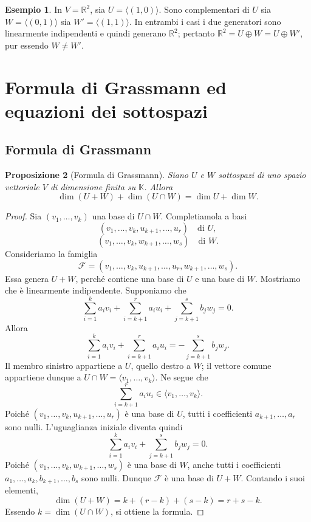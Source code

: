 \documentclass[11pt,a4paper]{article}
\newcommand{\RR}{\mathbb{R}}
\newcommand{\KK}{\mathbb{K}}
\theoremstyle{plain}
\newtheorem{prop}{Proposizione}[section]
\theoremstyle{definition}
\newtheorem{esempio}[prop]{Esempio}
\theoremstyle{remark}
\begin{document}
\begin{esempio}
In $V=\RR^2$, sia $U=\langle(1,0)\rangle$. Sono complementari di $U$ sia
$W=\langle(0,1)\rangle$ sia $W'=\langle(1,1)\rangle$. In entrambi i casi i
due generatori sono linearmente indipendenti e quindi generano $\RR^2$;
pertanto $\RR^2=U\oplus W=U\oplus W'$, pur essendo $W\ne W'$.
\end{esempio}

\section{Formula di Grassmann ed equazioni dei sottospazi}

\subsection{Formula di Grassmann}

\begin{prop}[Formula di Grassmann]\label{prop:grassmann}
Siano $U$ e $W$ sottospazi di uno spazio vettoriale $V$ di dimensione finita
su $\KK$. Allora
\[
 \dim(U+W)+\dim(U\cap W)=\dim U+\dim W.
\]
\end{prop}

\begin{proof}
Sia $(v_1,\ldots,v_k)$ una base di $U\cap W$. Completiamola a basi
\[
 (v_1,\ldots,v_k,u_{k+1},\ldots,u_r)\quad\text{di }U,
\]
\[
 (v_1,\ldots,v_k,w_{k+1},\ldots,w_s)\quad\text{di }W.
\]
Consideriamo la famiglia
\[
 \mathcal F=(v_1,\ldots,v_k,u_{k+1},\ldots,u_r,
 w_{k+1},\ldots,w_s).
\]
Essa genera $U+W$, perché contiene una base di $U$ e una base di $W$.
Mostriamo che è linearmente indipendente. Supponiamo che
\[
 \sum_{i=1}^k a_iv_i+\sum_{i=k+1}^r a_iu_i+
 \sum_{j=k+1}^s b_jw_j=0.
\]
Allora
\[
 \sum_{i=1}^k a_iv_i+\sum_{i=k+1}^r a_iu_i
 =-\sum_{j=k+1}^s b_jw_j.
\]
Il membro sinistro appartiene a $U$, quello destro a $W$; il vettore comune
appartiene dunque a $U\cap W=\langle v_1,\ldots,v_k\rangle$. Ne segue che
\[
 \sum_{i=k+1}^r a_iu_i\in\langle v_1,\ldots,v_k\rangle.
\]
Poiché $(v_1,\ldots,v_k,u_{k+1},\ldots,u_r)$ è una base di $U$, tutti i
coefficienti $a_{k+1},\ldots,a_r$ sono nulli. L'uguaglianza iniziale diventa
quindi
\[
 \sum_{i=1}^k a_iv_i+\sum_{j=k+1}^s b_jw_j=0.
\]
Poiché $(v_1,\ldots,v_k,w_{k+1},\ldots,w_s)$ è una base di $W$, anche tutti
i coefficienti $a_1,\ldots,a_k,b_{k+1},\ldots,b_s$ sono nulli. Dunque
$\mathcal F$ è una base di $U+W$. Contando i suoi elementi,
\[
 \dim(U+W)=k+(r-k)+(s-k)=r+s-k.
\]
Essendo $k=\dim(U\cap W)$, si ottiene la formula.
\end{proof}
\end{document}
